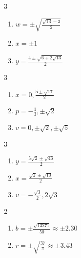 \documentclass{ximera}
\begin{document}
\begin{multicols}{3}
\begin{enumerate}
\setcounter{enumi}{\value{HW}}

\item $w = \pm \sqrt{\frac{\sqrt{13} - 3}{2}}$
\item $x = \pm 1$
\item $y = \frac{4 \pm \sqrt{6 + 2 \sqrt{13}}}{2}$

\setcounter{HW}{\value{enumi}}
\end{enumerate}
\end{multicols}

\begin{multicols}{3}
\begin{enumerate}
\setcounter{enumi}{\value{HW}}

\item $x = 0, \frac{5 \pm \sqrt{17}}{2}$
\item $p = -\frac{1}{3}, \pm \sqrt{2}$ 
\item $v = 0, \pm \sqrt{2}, \pm \sqrt{5}$

\setcounter{HW}{\value{enumi}}
\end{enumerate}
\end{multicols}



\begin{multicols}{3}
\begin{enumerate}
\setcounter{enumi}{\value{HW}}

\item $y = \frac{5\sqrt{2} \pm \sqrt{46}}{2}$
\item $x = \frac{\sqrt{2} \pm \sqrt{10}}{2}$
\item $v = -\frac{\sqrt{3}}{2}, 2\sqrt{3}$

\setcounter{HW}{\value{enumi}}
\end{enumerate}
\end{multicols}


\begin{multicols}{2}
\begin{enumerate}
\setcounter{enumi}{\value{HW}}

\item $b = \pm \frac{\sqrt{13271}}{50} \approx \pm 2.30$
\item $r = \pm \sqrt{\frac{37}{\pi}} \approx \pm 3.43$ 



\setcounter{HW}{\value{enumi}}
\end{enumerate}
\end{multicols}
\end{document}
